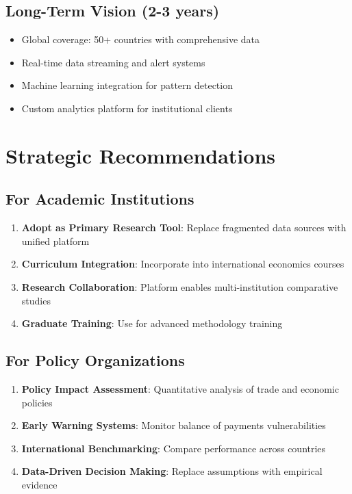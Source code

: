 \documentclass[11pt,a4paper]{article}
\begin{document}
\subsection{Long-Term Vision (2-3 years)}
\begin{itemize}
    \item Global coverage: 50+ countries with comprehensive data
    \item Real-time data streaming and alert systems
    \item Machine learning integration for pattern detection
    \item Custom analytics platform for institutional clients
\end{itemize}

\section{Strategic Recommendations}

\subsection{For Academic Institutions}
\begin{enumerate}
    \item \textbf{Adopt as Primary Research Tool}: Replace fragmented data sources with unified platform
    \item \textbf{Curriculum Integration}: Incorporate into international economics courses
    \item \textbf{Research Collaboration}: Platform enables multi-institution comparative studies
    \item \textbf{Graduate Training}: Use for advanced methodology training
\end{enumerate}

\subsection{For Policy Organizations}
\begin{enumerate}
    \item \textbf{Policy Impact Assessment}: Quantitative analysis of trade and economic policies
    \item \textbf{Early Warning Systems}: Monitor balance of payments vulnerabilities
    \item \textbf{International Benchmarking}: Compare performance across countries
    \item \textbf{Data-Driven Decision Making}: Replace assumptions with empirical evidence
\end{enumerate}
\end{document}
